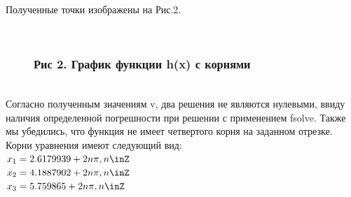 \documentclass[russian,utf8,nocolumnxxxi,nocolumnxxxii]{eskdtext}
\begin{document}
Полученные точки изображены на Рис.2.
\begin{figure}[H]
\begin{center}
\begin{minipage}[h]{0.65\linewidth}
  \\
\frametitle{Рис 2. График функции h(x) с корнями}
\end{minipage}
\end{center}
\end{figure}
\\
Согласно полученным значениям v, два решения не являются нулевыми, ввиду наличия определенной погрешности при решении с применением  fsolve. Также мы убедились, что функция не имеет четвертого корня на заданном отрезке.\\

Корни уравнения имеют следующий вид:\\
$x_1=2.6179939+2n\pi,n\inZ$\\
$x_2=4.1887902+2n\pi,n\inZ$\\
$x_3=5.759865+2n\pi,n\inZ$\\
\end{document}
